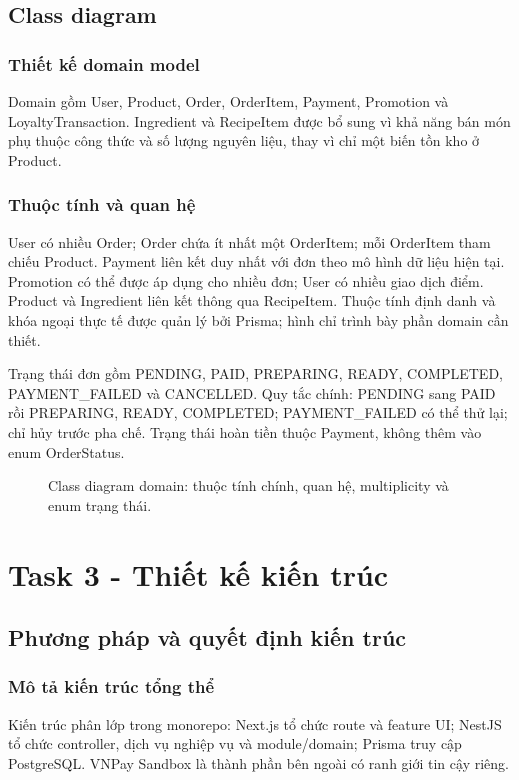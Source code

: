 \documentclass[12pt,a4paper]{article}
\begin{document}
\subsection{Class diagram}
\subsubsection{Thiết kế domain model}
Domain gồm User, Product, Order, OrderItem, Payment, Promotion và LoyaltyTransaction. Ingredient và RecipeItem được bổ sung vì khả năng bán món phụ thuộc công thức và số lượng nguyên liệu, thay vì chỉ một biến tồn kho ở Product.

\subsubsection{Thuộc tính và quan hệ}
User có nhiều Order; Order chứa ít nhất một OrderItem; mỗi OrderItem tham chiếu Product. Payment liên kết duy nhất với đơn theo mô hình dữ liệu hiện tại. Promotion có thể được áp dụng cho nhiều đơn; User có nhiều giao dịch điểm. Product và Ingredient liên kết thông qua RecipeItem. Thuộc tính định danh và khóa ngoại thực tế được quản lý bởi Prisma; hình chỉ trình bày phần domain cần thiết.

{\raggedright Trạng thái đơn gồm PENDING, PAID, PREPARING, READY, COMPLETED, PAYMENT\_FAILED và CANCELLED. Quy tắc chính: PENDING sang PAID rồi PREPARING, READY, COMPLETED; PAYMENT\_FAILED có thể thử lại; chỉ hủy trước pha chế. Trạng thái hoàn tiền thuộc Payment, không thêm vào enum OrderStatus.\par}

\begin{figure}[p]\centering

\caption{Class diagram domain: thuộc tính chính, quan hệ, multiplicity và enum trạng thái.}
\label{fig:class}
\end{figure}
\clearpage

\section{Task 3 - Thiết kế kiến trúc}
\subsection{Phương pháp và quyết định kiến trúc}
\subsubsection{Mô tả kiến trúc tổng thể}
Kiến trúc phân lớp trong monorepo: Next.js tổ chức route và feature UI; NestJS tổ chức controller, dịch vụ nghiệp vụ và module/domain; Prisma truy cập PostgreSQL. VNPay Sandbox là thành phần bên ngoài có ranh giới tin cậy riêng.
\end{document}
